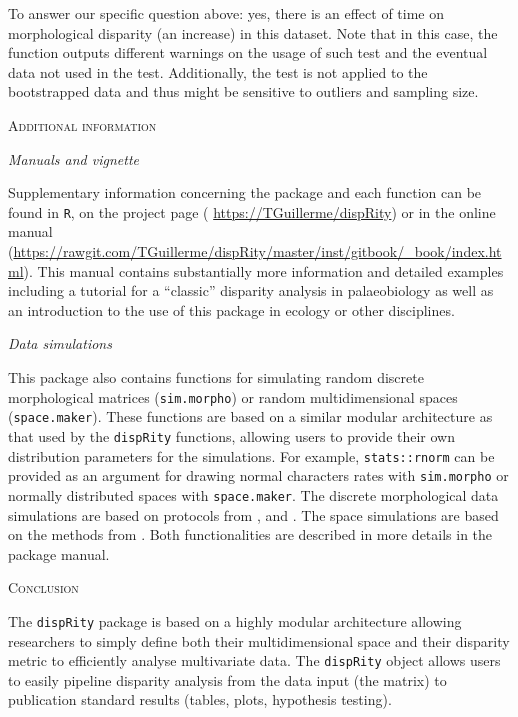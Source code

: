 \documentclass[12pt,letterpaper]{article}
\renewcommand{\section}[1]{%
\bigskip
\begin{center}
\begin{Large}
\normalfont\scshape #1
\medskip
\end{Large}
\end{center}}
\renewcommand{\subsection}[1]{%
\bigskip
\begin{center}
\begin{large}
\normalfont\itshape #1
\end{large}
\end{center}}
\newcommand{\disp}{\texttt{dispRity} }
\begin{document}
To answer our specific question above: yes, there is an effect of time on morphological disparity (an increase) in this dataset.
Note that in this case, the function outputs different warnings on the usage of such test and the eventual data not used in the test.
Additionally, the test is not applied to the bootstrapped data and thus might be sensitive to outliers and sampling size.

\section{Additional information}
\subsection{Manuals and vignette}
Supplementary information concerning the package and each function can be found in \texttt{R}, on the project page (
\url{https://TGuillerme/dispRity}) or in the online manual (\url{https://rawgit.com/TGuillerme/dispRity/master/inst/gitbook/_book/index.html}).
This manual contains substantially more information and detailed examples including a tutorial for a ``classic'' disparity analysis in palaeobiology as well as an introduction to the use of this package in ecology or other disciplines. 

\subsection{Data simulations}
This package also contains functions for simulating random discrete morphological matrices (\texttt{sim.morpho}) or random multidimensional spaces (\texttt{space.maker}).
These functions are based on a similar modular architecture as that used by the \texttt{dispRity} functions, allowing users to provide their own distribution parameters for the simulations.
For example, \texttt{stats::rnorm} can be provided as an argument for drawing normal characters rates with \texttt{sim.morpho} or normally distributed spaces with \texttt{space.maker}.
The discrete morphological data simulations are based on protocols from \cite{GuillermeCooper}, \cite{OReilly20160081} and \cite{puttick2017uncertain}.
The space simulations are based on the methods from \cite{diaz2016global}.
Both functionalities are described in more details in the package manual.

\section{Conclusion}
The \disp package is based on a highly modular architecture allowing researchers to simply define both their multidimensional space and their disparity metric to efficiently analyse multivariate data.
The \disp object allows users to easily pipeline disparity analysis from the data input (the matrix) to publication standard results (tables, plots, hypothesis testing).
\end{document}
